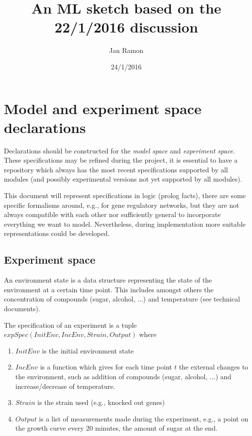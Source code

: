 \documentclass{article}
\begin{document}
\newcommand{\probmodelspace}{\mathcal{P}_\mathcal{M}}
\newcommand{\modelspace}{\mathcal{M}}
\newcommand{\expspace}{\mathcal{E}}

\author{Jan Ramon}
\title{An ML sketch based on the 22/1/2016 discussion}
\date{24/1/2016}
\maketitle

\section{Model and experiment space declarations}

Declarations should be constructed for the \textit{model space} and \textit{experiment space}.  These specifications may be refined during the project, it is essential to have a repository which always has the most recent specifications supported by all modules (and possibly experimental versions not yet supported by all modules).

This document will represent specifications in logic (prolog facts),
there are some specific formalisms around, e.g., for gene regulatory networks,
but they are not always compatible with each other nor sufficiently general to
incorporate everything we want to model.
Nevertheless, during implementation more suitable representations could be developed.

\subsection{Experiment space}

An environment state is a data structure representing the state of the environment at a certain time point.  This includes amongst others the concentration of compounds (sugar, alcohol, ...) and temperature (see technical documents).  

The specification of an experiment is a tuple $expSpec(InitEnv,IncEnv,Strain,Output)$ where
\begin{enumerate}
\item $InitEnv$ is the initial environment state
\item $IncEnv$ is a function which gives for each time point $t$ the external changes to the environment, such as addition of compounds (sugar, alcohol, ...) and increase/decrease of temperature.
\item $Strain$ is the strain used (e.g., knocked out genes)
\item $Output$ is a list of measurements made during the experiment, e.g., a point on the growth curve every 20 minutes, the amount of sugar at the end.
\end{enumerate}
\end{document}
